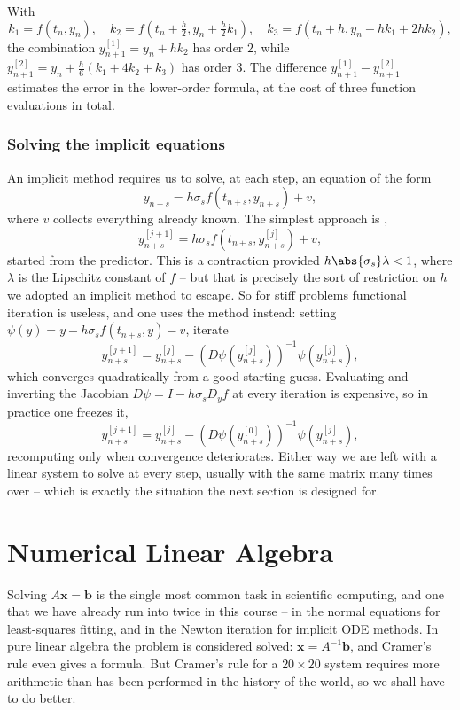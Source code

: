 \begin{example}
  With
  $$
  k_1 = f(t_n,y_n), \quad k_2 = f\left(t_n + \tfrac{h}{2}, y_n + \tfrac{h}{2}k_1\right), \quad k_3 = f\left(t_n + h, y_n - hk_1 + 2hk_2\right),
  $$
  the combination $y^{[1]}_{n+1} = y_n + hk_2$ has order $2$, while $y^{[2]}_{n+1} = y_n + \tfrac{h}{6}(k_1 + 4k_2 + k_3)$ has order $3$. The difference $y^{[1]}_{n+1} - y^{[2]}_{n+1}$ estimates the error in the lower-order formula, at the cost of three function evaluations in total.
\end{example}

\subsubsection*{Solving the implicit equations}

An implicit method requires us to solve, at each step, an equation of the form
$$
y_{n+s} = h\sigma_s f(t_{n+s}, y_{n+s}) + v,
$$
where $v$ collects everything already known. The simplest approach is ,
$$
y^{[j+1]}_{n+s} = h\sigma_s f\left(t_{n+s}, y^{[j]}_{n+s}\right) + v,
$$
started from the predictor. This is a contraction provided $h\abs{\sigma_s}\lambda < 1$, where $\lambda$ is the Lipschitz constant of $f$ -- but that is precisely the sort of restriction on $h$ we adopted an implicit method to escape. So for stiff problems functional iteration is useless, and one uses the  method instead: setting $\psi(y) = y - h\sigma_s f(t_{n+s},y) - v$, iterate
$$
y^{[j+1]}_{n+s} = y^{[j]}_{n+s} - \left(D\psi\left(y^{[j]}_{n+s}\right)\right)^{-1}\psi\left(y^{[j]}_{n+s}\right),
$$
which converges quadratically from a good starting guess. Evaluating and inverting the Jacobian $D\psi = I - h\sigma_s D_yf$ at every iteration is expensive, so in practice one freezes it,
$$
y^{[j+1]}_{n+s} = y^{[j]}_{n+s} - \left(D\psi\left(y^{[0]}_{n+s}\right)\right)^{-1}\psi\left(y^{[j]}_{n+s}\right),
$$
recomputing only when convergence deteriorates. Either way we are left with a linear system to solve at every step, usually with the same matrix many times over -- which is exactly the situation the next section is designed for.


\section{Numerical Linear Algebra}

Solving $A\mathbf{x} = \mathbf{b}$ is the single most common task in scientific computing, and one that we have already run into twice in this course -- in the normal equations for least-squares fitting, and in the Newton iteration for implicit ODE methods. In pure linear algebra the problem is considered solved: $\mathbf{x} = A^{-1}\mathbf{b}$, and Cramer's rule even gives a formula. But Cramer's rule for a $20\times 20$ system requires more arithmetic than has been performed in the history of the world, so we shall have to do better.

